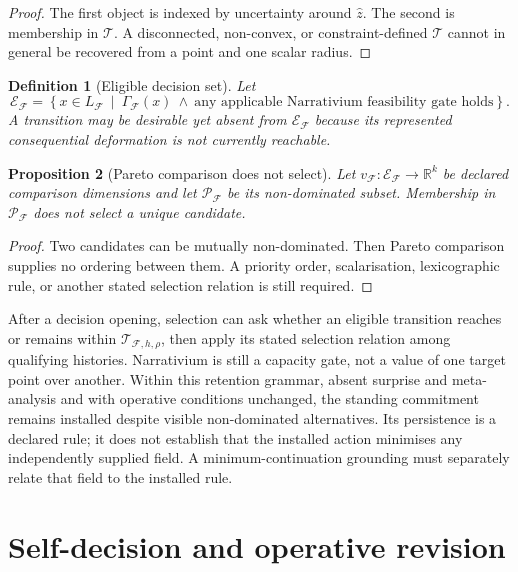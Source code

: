 \documentclass[11pt,a4paper]{article}
\newtheorem{definition}{Definition}[section]
\newtheorem{proposition}[definition]{Proposition}
\theoremstyle{remark}
\newcommand{\Frame}{\mathcal F}
\newcommand{\Target}{\mathcal T}
\newcommand{\Eligible}{\mathcal E}
\newcommand{\Pareto}{\mathcal P}
\begin{document}
\begin{proof}
The first object is indexed by uncertainty around \(\hat z\). The second is
membership in \(\Target\). A disconnected, non-convex, or constraint-defined
\(\Target\) cannot in general be recovered from a point and one scalar radius.
\end{proof}

\begin{definition}[Eligible decision set]\label{def:eligible}
Let
\[
\Eligible_{\Frame}=\left\{x\in L_{\Frame}\ \middle|\
\Gamma_{\Frame}(x)\ \land\ \text{any applicable Narrativium feasibility gate holds}\right\}.
\]
A transition may be desirable yet absent from \(\Eligible_{\Frame}\) because
its represented consequential deformation is not currently reachable.
\end{definition}

\begin{proposition}[Pareto comparison does not select]\label{prop:pareto}
Let \(v_{\Frame}:\Eligible_{\Frame}\to\mathbb{R}^k\) be declared comparison
dimensions and let \(\Pareto_{\Frame}\) be its non-dominated subset. Membership
in \(\Pareto_{\Frame}\) does not select a unique candidate.
\end{proposition}

\begin{proof}
Two candidates can be mutually non-dominated. Then Pareto comparison supplies
no ordering between them. A priority order, scalarisation, lexicographic rule,
or another stated selection relation is still required.
\end{proof}

After a decision opening, selection can ask whether an eligible transition
reaches or remains within \(\Target_{\Frame,h,\rho}\), then apply its stated
selection relation among qualifying histories. Narrativium is still a capacity
gate, not a value of one target point over another. Within this retention
grammar, absent surprise and meta-analysis and with operative conditions
unchanged, the standing commitment remains installed despite visible
non-dominated alternatives. Its persistence is a declared rule; it does not
establish that the installed action minimises any independently supplied
field. A minimum-continuation grounding must separately relate that field
to the installed rule.

\section{Self-decision and operative revision}\label{sec:self}
\end{document}
